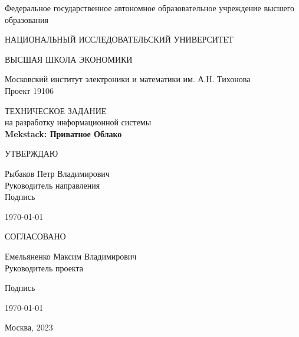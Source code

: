 \documentclass[14pt, a4paper]{extarticle}
\date{\today}
\begin{document}
\begin{titlepage}
    \begin{center}
        Федеральное государственное автономное образовательное учреждение высшего
        образования\par
        НАЦИОНАЛЬНЫЙ ИССЛЕДОВАТЕЛЬСКИЙ УНИВЕРСИТЕТ\par ВЫСШАЯ ШКОЛА ЭКОНОМИКИ\par
        \vspace{1cm}
        Московский институт электроники и математики им. А.Н. Тихонова \\
        \vspace{1cm}
        Проект 19106 \\
        \vspace{2cm}
    \end{center}

    \begin{center}
        ТЕХНИЧЕСКОЕ ЗАДАНИЕ \\
        на разработку информационной системы \\
        \textbf{Mekstack: Приватное Облако} \\
    \end{center}
    \vfill

    \begin{minipage}[t]{0.5\textwidth}
        \begin{center}
        УТВЕРЖДАЮ
        \end{center}
        \begin{flushleft}
        Рыбаков Петр Владимирович\\
        Руководитель направления\\

        \vspace{0.5cm}
        Подпись
        \vspace{0.5cm}

        \today
        \end{flushleft}
    \end{minipage}%

    \vspace{2cm}

    \begin{minipage}[t]{0.5\textwidth}
        \begin{center}
        СОГЛАСОВАНО
        \end{center}
        \begin{flushleft}
        Емельяненко Максим Владимирович\\
        Руководитель проекта

        \vspace{0.5cm}
        Подпись
        \vspace{0.5cm}

        \today
        \end{flushleft}
    \end{minipage}%

    \vspace{2cm}
    \center
    Москва, 2023
\end{titlepage}
\end{document}
